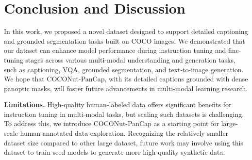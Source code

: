 \section{Conclusion and Discussion}

In this work, we proposed a novel dataset designed to support detailed captioning and grounded segmentation tasks built on COCO images. We demonstrated that our dataset can enhance model performance during instruction tuning and fine-tuning stages across various multi-modal understanding and generation tasks, such as captioning, VQA, grounded segmentation, and text-to-image generation. We hope that COCONut-PanCap, with its detailed captions grounded with dense panoptic masks, will foster future advancements in multi-modal learning research.


\noindent\textbf{Limitations.}
High-quality human-labeled data offers significant benefits for instruction tuning in multi-modal tasks, but scaling such datasets is challenging. To address this, we introduce  COCONut-PanCap as a starting point for large-scale human-annotated data exploration. 
Recognizing the relatively smaller dataset size compared to other large dataset, future work may involve using this dataset to train seed models to generate more high-quality synthetic data.
